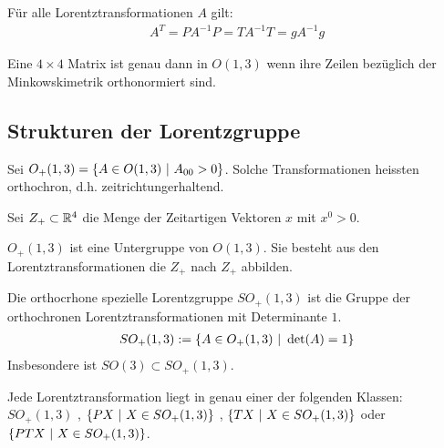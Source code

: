 \begin{lemma}
    Für alle Lorentztransformationen $A$ gilt:
    \begin{align*}
        A^T = P A^{-1} P = T A^{-1} T = g A^{-1} g
    \end{align*}
\end{lemma}

\begin{korollar}
    Eine $4 \times 4$ Matrix ist genau dann in $O(1,3)$ wenn ihre Zeilen
    bezüglich der Minkowskimetrik orthonormiert sind.
\end{korollar}


\subsection{Strukturen der Lorentzgruppe}

\begin{definition}[$O_+ (1,3)$]
    Sei $O_+ (1,3) = \left\{ A \in O(1,3) \ | \ A_{00} > 0 \right\}$.
    Solche Transformationen heissten orthochron, d.h. zeitrichtungerhaltend.
\end{definition}

\begin{definition}[$Z_+$]
    Sei $Z_+ \subset \mathbb{R}^4$ die Menge der Zeitartigen Vektoren $x$ mit $x^0 > 0$.
\end{definition}

\begin{satz}
    $O_+ (1,3)$ ist eine Untergruppe von $O(1,3)$. Sie besteht aus den
    Lorentztransformationen die $Z_+$ nach $Z_+$ abbilden.
\end{satz}

\begin{definition}[$SO_+ (1,3)$]
    Die orthocrhone spezielle Lorentzgruppe $SO_+(1,3)$ ist die Gruppe der
    orthochronen Lorentztransformationen mit Determinante $1$.
    \begin{align*}
        SO_+ (1,3) := \left\{ A \in O_+ (1,3) \ | \ \det(A) = 1 \right\}
    \end{align*}
    Insbesondere ist $SO(3) \subset SO_+ (1,3)$.
\end{definition}

\begin{satz}
    Jede Lorentztransformation liegt in genau einer der folgenden Klassen:
    $SO_+ (1,3)$ , $\left\{ P X \ | \ X \in SO_+ (1,3) \right\}$ ,
    $\left\{ T X \ | \ X \in SO_+ (1,3) \right\}$ oder
    $\left\{ P T X \ | \ X \in SO_+ (1,3) \right\}$.
\end{satz}

